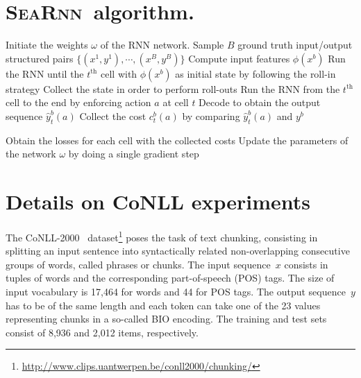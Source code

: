 \documentclass{article}
\newcommand{\SEARNN}{\textsc{SeaRnn}}
\begin{document}
	\section{\SEARNN\ algorithm.}
\label{app:alg}
\begin{algorithm}[]
	\caption{\SEARNN\ algorithm (for a simple encoder-decoder network)}
	\label{jcrAlgo}
	\begin{algorithmic}
		\State Initiate the weights $\omega$ of the RNN network.
		\State Sample $B$ ground truth input/output structured pairs  $\{(x^1, y^1), \cdots,(x^B,y^B)\}$
		\State Compute input features $\phi(x^b)$
		\State Run the RNN until the $t^{\text{th}}$ cell with $\phi(x^b)$  as initial state by following the roll-in strategy
		\State Collect the state in order to perform roll-outs
		\State Run the RNN from the $t^{\text{th}}$ cell to the end by enforcing action $a$ at cell $t$
		\State Decode to obtain the output sequence $\hat{y}^b_t(a)$
		\State Collect the cost $c_t^b(a)$ by comparing $\hat{y}^b_t(a)$ and $y^b$

		\EndFor
		\EndFor
		\EndFor

		\State Obtain the losses for each cell with the collected costs
		\State Update the parameters of the network $\omega$ by doing a single gradient step
		\EndFor
	\end{algorithmic}
\end{algorithm}


	\section{Details on CoNLL experiments}

	\label{app:conll}
	The CoNLL-2000~\citep{Sang2000} dataset\footnote{\url{http://www.clips.uantwerpen.be/conll2000/chunking/}} poses the task of text chunking, consisting in splitting an input sentence into syntactically related non-overlapping consecutive groups of words, called phrases or chunks.
	The input sequence~$x$ consists in tuples of words and the corresponding part-of-speech (POS) tags.
	The size of input vocabulary is 17,464 for words and 44 for POS tags.
	The output sequence~$y$ has to be of the same length and each token can take one of the 23 values representing chunks in a so-called BIO encoding.
	The training and test sets consist of 8,936 and 2,012 items, respectively.
\end{document}
